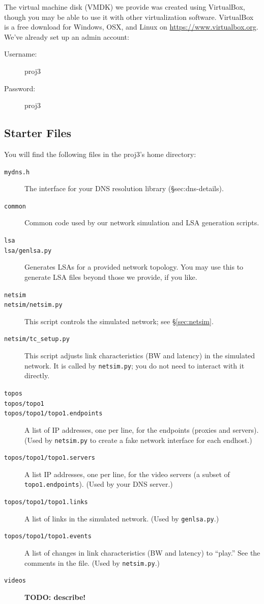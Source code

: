 \documentclass{article}
\begin{document}
The virtual machine disk (VMDK) we provide was created using VirtualBox, though
you may be able to use it with other virtualization software. VirtualBox is a
free download for Windows, OSX, and Linux on \url{https://www.virtualbox.org}.
We've already set up an admin account:
\begin{description}
	\item[Username:] proj3
	\item[Password:] proj3
\end{description}


\subsection{Starter Files}
You will find the following files in the proj3's home directory:
\begin{description}
	\item[\texttt{mydns.h}] The interface for your DNS resolution library (\S{sec:dns-details}).

	\item[\texttt{common}] Common code used by our network simulation and LSA generation scripts.

	\item[\texttt{lsa}]
	\item[\texttt{lsa/genlsa.py}] Generates LSAs for a provided network
	topology. You may use this to generate LSA files beyond those we provide,
	if you like.

	\item[\texttt{netsim}]
	\item[\texttt{netsim/netsim.py}] This script controls the simulated
	network; see \S\ref{sec:netsim}.
	\item[\texttt{netsim/tc\_setup.py}] This script adjusts link
	characteristics (BW and latency) in the simulated network. It is called by
	\texttt{netsim.py}; you do not need to interact with it directly.

	\item[\texttt{topos}]
	\item[\texttt{topos/topo1}]
	\item[\texttt{topos/topo1/topo1.endpoints}] A list of IP addresses, one per line, for the endpoints (proxies and servers). (Used by \texttt{netsim.py} to create a fake network interface for each endhost.)
	\item[\texttt{topos/topo1/topo1.servers}] A list IP addresses, one per line, for the video servers (a subset of \texttt{topo1.endpoints}). (Used by your DNS server.)
	\item[\texttt{topos/topo1/topo1.links}] A list of links in the simulated network. (Used by \texttt{genlsa.py}.)
	\item[\texttt{topos/topo1/topo1.events}] A list of changes in link characteristics (BW and latency) to ``play.'' See the comments in the file. (Used by \texttt{netsim.py}.)

	\item[\texttt{videos}] \textbf{TODO: describe!}
\end{description}
\end{document}
